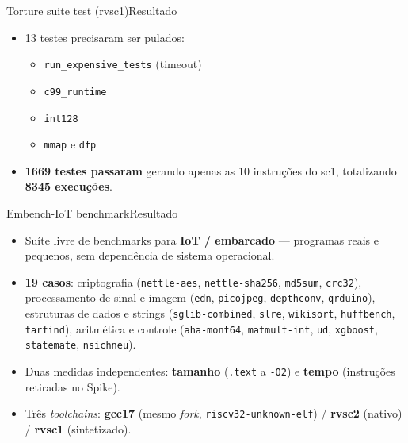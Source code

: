 \documentclass[aspectratio=169]{beamer} %
\begin{document}
\begin{frame}{Torture suite test (rvsc1)}{Resultado}
    \begin{itemize}
        \item 13 testes precisaram ser pulados:
        \begin{itemize}
            \item \texttt{run\_expensive\_tests} (timeout)
            \item \texttt{c99\_runtime}
            \item \texttt{int128}
            \item \texttt{mmap} e \texttt{dfp}
        \end{itemize}
        \item \textbf{1669 testes passaram} gerando apenas as 10 instruções
              do sc1, totalizando \textbf{8345 execuções}.
    \end{itemize}
\end{frame}

\begin{frame}{Embench-IoT benchmark}{Resultado}
    \begin{itemize}
        \item Suíte livre de benchmarks para \textbf{IoT / embarcado} ---
              programas reais e pequenos, sem dependência de sistema
              operacional.
        \item \textbf{19 casos}: criptografia (\texttt{nettle-aes},
              \texttt{nettle-sha256}, \texttt{md5sum}, \texttt{crc32}),
              processamento de sinal e imagem (\texttt{edn},
              \texttt{picojpeg}, \texttt{depthconv}, \texttt{qrduino}),
              estruturas de dados e strings (\texttt{sglib-combined},
              \texttt{slre}, \texttt{wikisort}, \texttt{huffbench},
              \texttt{tarfind}), aritmética e controle
              (\texttt{aha-mont64}, \texttt{matmult-int}, \texttt{ud},
              \texttt{xgboost}, \texttt{statemate}, \texttt{nsichneu}).
        \item Duas medidas independentes: \textbf{tamanho} (\texttt{.text} a
              \texttt{-O2}) e \textbf{tempo} (instruções retiradas no Spike).
        \item Três \textit{toolchains}: \textbf{gcc17} (mesmo \textit{fork},
              \texttt{riscv32-unknown-elf}) / \textbf{rvsc2} (nativo) /
              \textbf{rvsc1} (sintetizado).
    \end{itemize}
\end{frame}
\end{document}
